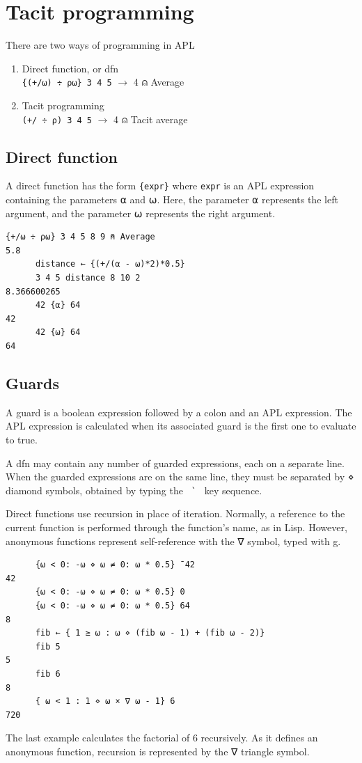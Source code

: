 \documentclass[a4paper,12pt]{book}
\begin{document}
\chapter{Tacit programming}

There are two ways of programming in APL
\begin{enumerate}
\item Direct function, or dfn
  \\ \verb|{(+/⍵) ÷ ⍴⍵} 3 4 5| $\rightarrow$ 4 ⍝ Average
\item Tacit programming\\
  \verb|(+/ ÷ ⍴) 3 4 5| $\rightarrow$ 4 ⍝ Tacit average
\end{enumerate}


\section{Direct function}

A direct function has the form \verb|{expr}|
where \verb|expr| is an APL expression
containing the parameters ⍺ and ⍵.
Here, the parameter ⍺ represents the left
argument, and the parameter ⍵ represents
the right argument.
\begin{lstlisting}[language=apl]
      {+/⍵ ÷ ⍴⍵} 3 4 5 8 9 ⍝ Average
5.8
      distance ← {(+/(⍺ - ⍵)*2)*0.5}
      3 4 5 distance 8 10 2
8.366600265
      42 {⍺} 64
42
      42 {⍵} 64
64
\end{lstlisting}

\section{Guards}
A guard is a boolean expression followed
by a colon and an APL expression.
The APL expression is calculated when
its associated guard is the first one
to evaluate to true.

A dfn may contain any number of guarded
expressions, each on a separate line.
When the guarded expressions
are on the same line, they must be separated
by ⋄ diamond symbols, obtained by
typing the \cmdkey\verb| ` | key sequence.

Direct functions use recursion in place of iteration.
Normally, a reference to the current function
is performed through the function’s name,
as in Lisp. However, anonymous
functions represent self-reference with
the ∇ symbol, typed with \cmdkey g.
\begin{verbatim}
      {⍵ < 0: -⍵ ⋄ ⍵ ≠ 0: ⍵ * 0.5} ¯42
42
      {⍵ < 0: -⍵ ⋄ ⍵ ≠ 0: ⍵ * 0.5} 0
      {⍵ < 0: -⍵ ⋄ ⍵ ≠ 0: ⍵ * 0.5} 64
8
      fib ← { 1 ≥ ⍵ : ⍵ ⋄ (fib ⍵ - 1) + (fib ⍵ - 2)}
      fib 5
5
      fib 6
8
      { ⍵ < 1 : 1 ⋄ ⍵ × ∇ ⍵ - 1} 6
720
\end{verbatim}
The last example calculates the
factorial of 6 recursively.
As it defines an anonymous function,
recursion is represented by the ∇ triangle symbol.
\end{document}
